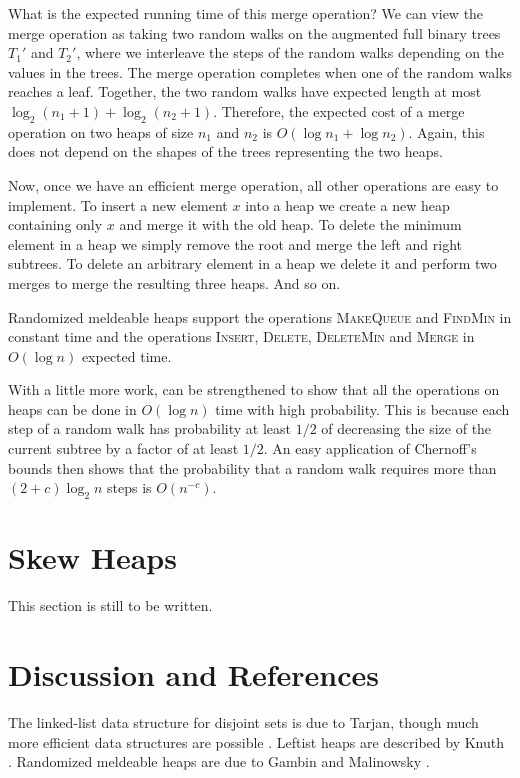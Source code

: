 What is the expected running time of this merge operation?  We can
view the merge operation as taking two random walks on the augmented
full binary trees $T_1'$ and $T_2'$, where we interleave the steps of
the random walks depending on the values in the trees.  The merge
operation completes when one of the random walks reaches a leaf.
Together, the two random walks have expected length at most
$\log_2(n_1+1)+\log_2 (n_2+1)$.  Therefore, the expected cost of a
merge operation on two heaps of size $n_1$ and $n_2$ is $O(\log n_1 +
\log n_2)$.  Again, this does not depend on the shapes of the trees
representing the two heaps.

Now, once we have an efficient merge operation, all other operations
are easy to implement.  To insert a new element $x$ into a heap we
create a new heap containing only $x$ and merge it with the old heap.
To delete the minimum element in a heap we simply remove the root and
merge the left and right subtrees.  To delete an arbitrary element in
a heap we delete it and perform two merges to merge the resulting
three heaps.  And so on.  

\begin{thm}
Randomized meldeable heaps support the operations \textsc{MakeQueue}
and \textsc{FindMin} in constant time and the operations
\textsc{Insert}, \textsc{Delete}, \textsc{DeleteMin} and
\textsc{Merge} in $O(\log n)$ expected time.
\end{thm}

With a little more work,  can be strengthened to show
that all the operations on heaps can be done in $O(\log n)$ time with
high probability.  This is because each step of a random walk has
probability at least $1/2$ of decreasing the size of the current
subtree by a factor of at least $1/2$.  An easy application of
Chernoff's bounds then shows that the probability that a random walk
requires more than $(2+c)\log_2 n$ steps is $O(n^{-c})$.



\section{Skew Heaps}

This section is still to be written.


\section{Discussion and References}

The linked-list data structure for disjoint sets is due to Tarjan,
though much more efficient data structures are possible \cite{t75}.
Leftist heaps are described by Knuth \cite{k96}.  Randomized meldeable
heaps are due to Gambin and Malinowsky \cite{gm98}.




